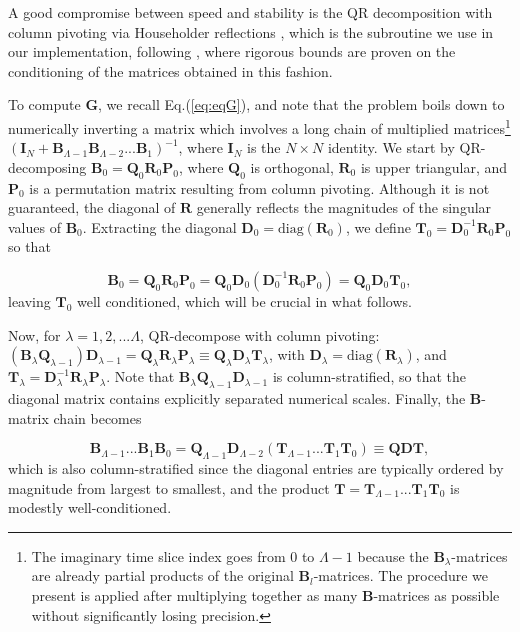 A good compromise between speed and stability is the QR decomposition with column pivoting via Householder reflections \cite{newman_computational_2012}, which is the subroutine we use in our implementation, following \cite{bai_stable_2011}, where rigorous bounds are proven on the conditioning of the matrices obtained in this fashion.

To compute $\bm G$, we recall Eq.(\ref{eq:eqG}), and note that the problem boils down to numerically inverting a matrix which involves a long chain of multiplied matrices\footnote{The imaginary time slice index goes from 0 to $\Lambda - 1$ because the $\bm B_\lambda$-matrices are already partial products of the original $\bm B_l$-matrices.
The procedure we present is applied after multiplying together as many $\bm B$-matrices as possible without significantly losing precision.} $(\bm I_N + \bm B_{\Lambda-1} \bm B_{\Lambda-2} ... \bm B_1)^{-1}$, where $\bm I_N$ is the $N \times N$ identity.
We start by QR-decomposing $\bm B_0 = \bm Q_0 \bm R_0 \bm P_0$, where $\bm Q_0$ is orthogonal, $\bm R_0$ is upper triangular, and $\bm P_0$ is a permutation matrix resulting from column pivoting.
Although it is not guaranteed, the diagonal of $\bm R$ generally reflects the magnitudes of the singular values of $\bm B_0$.
Extracting the diagonal $\bm D_0 = \text{diag} ( \bm R_0 )$, we define $\bm T_0 = \bm D_0^{-1} \bm R_0 \bm P_0$ so that

\begin{equation}
\bm B_0 = \bm Q_0 \bm R_0 \bm P_0 = \bm Q_0 \bm D_0 ( \bm D_0^{-1} \bm R_0 \bm P_0 ) = \bm Q_0 \bm D_0 \bm T_0 ,
\end{equation}
leaving $\bm T_0$ well conditioned, which will be crucial in what follows.

Now, for $\lambda = 1, 2, ... \Lambda$, QR-decompose with column pivoting: $(\bm B_\lambda \bm Q_{\lambda-1}) \bm D_{\lambda-1} = \bm Q_\lambda \bm R_\lambda \bm P_\lambda \equiv \bm Q_\lambda \bm D_\lambda \bm T_\lambda$, with $\bm D_\lambda = \text{diag} ( \bm R_\lambda ) $, and $\bm T_\lambda = \bm D_\lambda^{-1} \bm R_\lambda \bm P_\lambda$.
Note that $\bm B_\lambda \bm Q_{\lambda-1} \bm D_{\lambda-1}$ is column-stratified, so that the diagonal matrix contains explicitly separated numerical scales.
Finally, the $\bm B$-matrix chain becomes

\begin{equation}
\bm B_{\Lambda - 1} ... \bm B_1 \bm B_0 = \bm Q_{\Lambda - 1} \bm D_{\Lambda -2 } ( \bm T_{\Lambda-1} ... \bm T_1 \bm T_0 ) \equiv \bm Q \bm D \bm T ,
\end{equation}
which is also column-stratified since the diagonal entries are typically ordered by magnitude from largest to smallest, and the product $\bm T = \bm T_{\Lambda-1} ... \bm T_1 \bm T_0$ is modestly well-conditioned.

